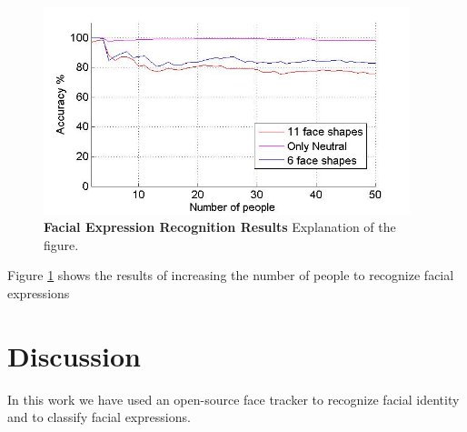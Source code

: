 \documentclass[]{article}
\begin{document}
\begin{figure}[ht]
\begin{center}
\vspace{-3mm}
\includegraphics[width=0.95\textwidth]{figures/peopleRecognition4.jpg}
\end{center}
\caption{\textbf{Facial Expression Recognition Results} Explanation of the figure.}
\label{feRecognition}
\end{figure}


Figure \ref{feRecognition} shows the results of increasing the number of people
to recognize facial expressions


\section{Discussion}
In this work we have used an open-source face tracker to recognize facial identity and to classify facial expressions.




\end{document}
